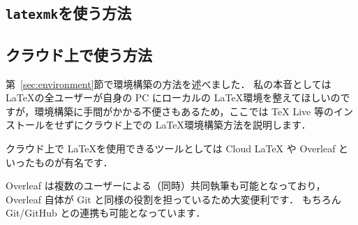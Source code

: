 \subsection{\texttt{latexmk}を使う方法}
\label{ssec:latexmk}




\subsection{クラウド上で使う方法}
\label{ssec:cloud}

第~\ref{sec:environment}節で環境構築の方法を述べました．
私の本音としては \LaTeX の全ユーザーが自身の PC にローカルの \LaTeX 環境を整えてほしいのですが，環境構築に手間がかかる不便さもあるため，ここでは TeX Live 等のインストールをせずにクラウド上での \LaTeX 環境構築方法を説明します．

クラウド上で \LaTeX を使用できるツールとしては Cloud LaTeX や Overleaf といったものが有名です．

Overleaf は複数のユーザーによる（同時）共同執筆も可能となっており，Overleaf 自体が Git と同様の役割を担っているため大変便利です．
もちろん Git/GitHub との連携も可能となっています．



\lipsum[1-4]
